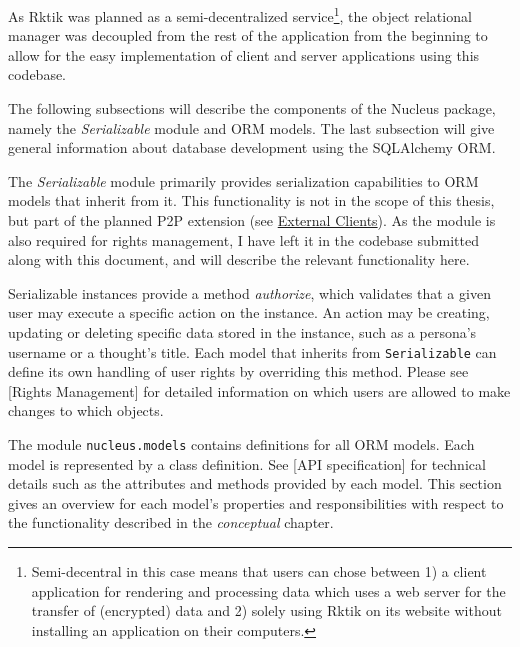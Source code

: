 As Rktik was planned as a semi-decentralized service\footnote{Semi-decentral
  in this case means that users can chose between 1) a client
  application for rendering and processing data which uses a web server
  for the transfer of (encrypted) data and 2) solely using Rktik on its
  website without installing an application on their computers.}, the
object relational manager was decoupled from the rest of the application
from the beginning to allow for the easy implementation of client and
server applications using this codebase.

The following subsections will describe the components of the Nucleus
package, namely the \emph{Serializable} module and ORM models. The last
subsection will give general information about database development
using the SQLAlchemy ORM.


The \emph{Serializable} module primarily provides serialization
capabilities to ORM models that inherit from it. This functionality is
not in the scope of this thesis, but part of the planned P2P extension
(see \hyperref[external-clients]{External Clients}). As the module is
also required for rights management, I have left it in the codebase
submitted along with this document, and will describe the relevant
functionality here.

Serializable instances provide a method \emph{authorize}, which
validates that a given user may execute a specific action on the
instance. An action may be creating, updating or deleting specific data
stored in the instance, such as a persona's username or a thought's
title. Each model that inherits from \texttt{Serializable} can define
its own handling of user rights by overriding this method. Please see
{[}Rights Management{]} for detailed information on which users are
allowed to make changes to which objects.


The module \texttt{nucleus.models} contains definitions for all ORM
models. Each model is represented by a class definition. See {[}API
specification{]} for technical details such as the attributes and
methods provided by each model. This section gives an overview for each
model's properties and responsibilities with respect to the
functionality described in the \emph{conceptual} chapter.

